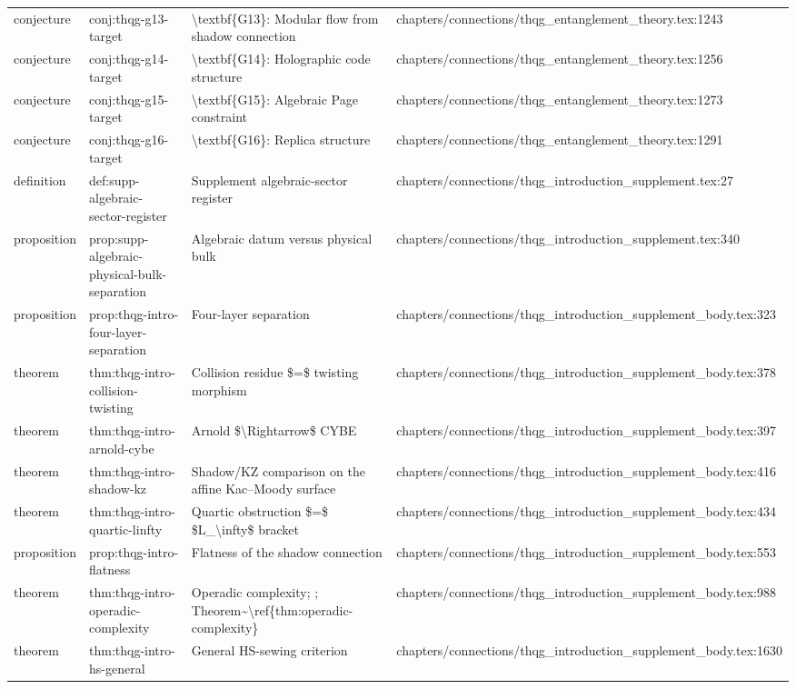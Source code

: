 \documentclass[11pt]{article}
\begin{document}
\begin{longtable}{L{0.10\textwidth}L{0.26\textwidth}L{0.42\textwidth}L{0.22\textwidth}}
conjecture & conj:thqg-g13-target & \textbackslash{}textbf\{G13\}: Modular flow from shadow connection & chapters/connections/thqg\_entanglement\_theory.tex:1243\\
conjecture & conj:thqg-g14-target & \textbackslash{}textbf\{G14\}: Holographic code structure & chapters/connections/thqg\_entanglement\_theory.tex:1256\\
conjecture & conj:thqg-g15-target & \textbackslash{}textbf\{G15\}: Algebraic Page constraint & chapters/connections/thqg\_entanglement\_theory.tex:1273\\
conjecture & conj:thqg-g16-target & \textbackslash{}textbf\{G16\}: Replica structure & chapters/connections/thqg\_entanglement\_theory.tex:1291\\
definition & def:supp-algebraic-sector-register & Supplement algebraic-sector register & chapters/connections/thqg\_introduction\_supplement.tex:27\\
proposition & prop:supp-algebraic-physical-bulk-separation & Algebraic datum versus physical bulk & chapters/connections/thqg\_introduction\_supplement.tex:340\\
proposition & prop:thqg-intro-four-layer-separation & Four-layer separation & chapters/connections/thqg\_introduction\_supplement\_body.tex:323\\
theorem & thm:thqg-intro-collision-twisting & Collision residue \$=\$ twisting morphism & chapters/connections/thqg\_introduction\_supplement\_body.tex:378\\
theorem & thm:thqg-intro-arnold-cybe & Arnold \$\textbackslash{}Rightarrow\$ CYBE & chapters/connections/thqg\_introduction\_supplement\_body.tex:397\\
theorem & thm:thqg-intro-shadow-kz & Shadow/KZ comparison on the affine Kac--Moody surface & chapters/connections/thqg\_introduction\_supplement\_body.tex:416\\
theorem & thm:thqg-intro-quartic-linfty & Quartic obstruction \$=\$ \$L\_\textbackslash{}infty\$ bracket & chapters/connections/thqg\_introduction\_supplement\_body.tex:434\\
proposition & prop:thqg-intro-flatness & Flatness of the shadow connection & chapters/connections/thqg\_introduction\_supplement\_body.tex:553\\
theorem & thm:thqg-intro-operadic-complexity & Operadic complexity; ; Theorem\textasciitilde{}\textbackslash{}ref\{thm:operadic-complexity\} & chapters/connections/thqg\_introduction\_supplement\_body.tex:988\\
theorem & thm:thqg-intro-hs-general & General HS-sewing criterion & chapters/connections/thqg\_introduction\_supplement\_body.tex:1630\\

\end{longtable}
\end{document}
